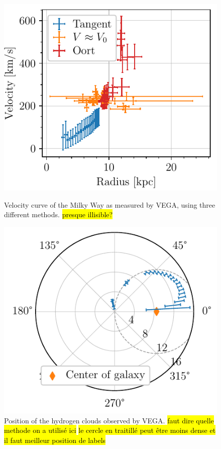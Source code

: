 \begin{figure}[htbp]
    \begin{minipage}[t]{0.5\textwidth}
        \centering
        \captionsetup{width=.95\textwidth}
        \includegraphics[scale=1]{figures/VEGA2_velocity_curve.pdf}
        \caption{Velocity curve of the Milky Way as measured by VEGA, using three different methods. \hl{presque illisible?}}
        \label{fig:VEGA_velocity_curve}
    \end{minipage}
    \begin{minipage}[t]{0.5\textwidth}
        \centering
        \captionsetup{width=.95\textwidth}
        \includegraphics[scale=1]{figures/VEGA_galaxy_map.pdf}
        \caption{Position of the hydrogen clouds observed by VEGA. \hl{faut dire quelle methode on a utilisé ici} \hl{le cercle en traitillé peut être moins dense et il faut meilleur position de labels}}
        \label{fig:VEGA_galaxy_map}
    \end{minipage}
\end{figure}

